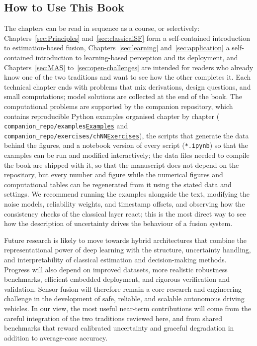\documentclass[graybox,envcountchap]{style/SNmono}
\newcommand{\repopath}[1]{\texttt{#1}}
\providecommand{\DIFadd}[1]{{\protect\color{blue} #1}} %
\providecommand{\DIFdel}[1]{{\protect\color{red} #1}} %
\providecommand{\DIFaddbegin}{} %
\providecommand{\DIFaddend}{} %
\providecommand{\DIFdelbegin}{} %
\providecommand{\DIFdelend}{} %
\DeclareRobustCommand{\RtwoDel}[1]{{\color{red}%
  \renewcommand{\DIFadd}[1]{##1}\renewcommand{\DIFdel}[1]{##1}%
  #1}}
\DeclareRobustCommand{\RtwoAdd}[1]{{\color{blue}#1}}
\DeclareRobustCommand{\codeentry}[1]{\hyperref[code:#1]{\texttt{#1}}}
\begin{document}
\subsection*{How to Use This Book}

The chapters can be read in sequence as a course, or selectively: Chapters~\ref{sec:Principles} and~\ref{sec:classicalSF} form a self-contained introduction to estimation-based fusion, Chapters~\ref{sec:learning} and~\ref{sec:application} a self-contained introduction to learning-based perception and its deployment, and Chapters~\ref{sec:MAS} to~\ref{sec:open-challenges} are intended for readers who already know one of the two traditions and want to see how the other completes it. Each technical chapter ends with problems that mix derivations, design questions, and small computations; model solutions are collected at the end of the book. The computational problems are supported by the companion repository, which contains reproducible Python examples organised chapter by chapter (\RtwoDel{\repopath{companion\_\allowbreak repo/\allowbreak examples}}\RtwoAdd{\codeentry{Examples}} and \RtwoDel{\repopath{companion\_\allowbreak repo/\allowbreak exercises/\allowbreak chNN}}\RtwoAdd{\codeentry{Exercises}}), the scripts that generate the data behind the figures, and a notebook version of every script (\repopath{*.ipynb}) so that the examples can be run and modified interactively; the data files needed to compile the book are shipped with it, so that the manuscript does not depend on the repository, \DIFdelbegin \DIFdel{but every number and figure }\DIFdelend \DIFaddbegin \DIFadd{while the numerical figures and computational tables }\DIFaddend can be regenerated \DIFdelbegin \DIFdel{from it}\DIFdelend \DIFaddbegin \DIFadd{using the stated data and settings}\DIFaddend . We recommend running the examples alongside the text, modifying the noise models, reliability weights, and timestamp offsets, and observing how the consistency checks of the classical layer react; this is the most direct way to see how the description of uncertainty drives the behaviour of a fusion system.

Future research is likely to move towards hybrid architectures that combine the representational power of deep learning with the structure, uncertainty handling, and interpretability of classical estimation and decision-making methods. Progress will also depend on improved datasets, more realistic robustness benchmarks, efficient embedded deployment, and rigorous verification and validation. Sensor fusion will therefore remain a core research and engineering challenge in the development of safe, reliable, and scalable autonomous driving vehicles. 
In our view, the most useful near-term contributions will come from the careful integration of the two traditions reviewed here, and from shared benchmarks that reward calibrated uncertainty and graceful degradation in addition to average-case accuracy.
\end{document}
